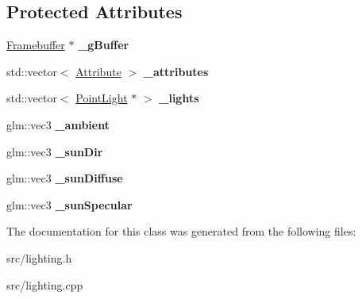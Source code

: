 \subsection*{Protected Attributes}
\begin{DoxyCompactItemize}
\item 
\hypertarget{class_lighting_a85e99efa5af1df4462e6e63c7886701d}{}\hyperlink{class_framebuffer}{Framebuffer} $\ast$ {\bfseries \+\_\+g\+Buffer}\label{class_lighting_a85e99efa5af1df4462e6e63c7886701d}

\item 
\hypertarget{class_lighting_a05e11ba57df9a979c8913276eb4c2fe0}{}std\+::vector$<$ \hyperlink{class_attribute}{Attribute} $>$ {\bfseries \+\_\+attributes}\label{class_lighting_a05e11ba57df9a979c8913276eb4c2fe0}

\item 
\hypertarget{class_lighting_adcc02d75999339a316e9ff9c909ba0ee}{}std\+::vector$<$ \hyperlink{class_point_light}{Point\+Light} $\ast$ $>$ {\bfseries \+\_\+lights}\label{class_lighting_adcc02d75999339a316e9ff9c909ba0ee}

\item 
\hypertarget{class_lighting_ad2ad50701ec4fc496bf786a1c64f6442}{}glm\+::vec3 {\bfseries \+\_\+ambient}\label{class_lighting_ad2ad50701ec4fc496bf786a1c64f6442}

\item 
\hypertarget{class_lighting_acd98b5fd27f0267fd4106c8749e7c1f0}{}glm\+::vec3 {\bfseries \+\_\+sun\+Dir}\label{class_lighting_acd98b5fd27f0267fd4106c8749e7c1f0}

\item 
\hypertarget{class_lighting_ae1fb12c3c1bff3ebe4224b5417860e7f}{}glm\+::vec3 {\bfseries \+\_\+sun\+Diffuse}\label{class_lighting_ae1fb12c3c1bff3ebe4224b5417860e7f}

\item 
\hypertarget{class_lighting_a149d381c877a39f01bfdab7f6842001c}{}glm\+::vec3 {\bfseries \+\_\+sun\+Specular}\label{class_lighting_a149d381c877a39f01bfdab7f6842001c}

\end{DoxyCompactItemize}


The documentation for this class was generated from the following files\+:\begin{DoxyCompactItemize}
\item 
src/lighting.\+h\item 
src/lighting.\+cpp\end{DoxyCompactItemize}
